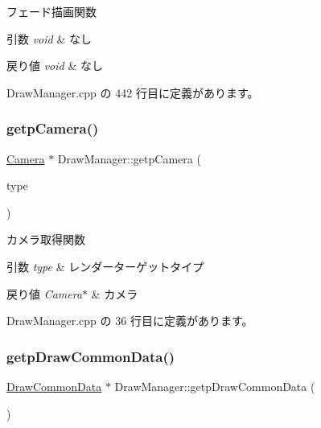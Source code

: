 フェード描画関数 


\begin{DoxyParams}{引数}
{\em void} & なし \\
\hline
\end{DoxyParams}

\begin{DoxyRetVals}{戻り値}
{\em void} & なし \\
\hline
\end{DoxyRetVals}


 Draw\+Manager.\+cpp の 442 行目に定義があります。

\mbox{\label{class_draw_manager_ac378ded8b0ef8c4fec3215b0a948680b}} 
\subsubsection{\texorpdfstring{getp\+Camera()}{getpCamera()}}
{\footnotesize\ttfamily \mbox{\hyperlink{class_camera}{Camera}} $\ast$ Draw\+Manager\+::getp\+Camera (\begin{DoxyParamCaption}\item[{\mbox{\hyperlink{class_draw_manager_a7ade407aee706c02454da2e53a559c9c}{Render\+Target\+Type}}}]{type }\end{DoxyParamCaption})}



カメラ取得関数 


\begin{DoxyParams}{引数}
{\em type} & レンダーターゲットタイプ \\
\hline
\end{DoxyParams}

\begin{DoxyRetVals}{戻り値}
{\em Camera$\ast$} & カメラ \\
\hline
\end{DoxyRetVals}


 Draw\+Manager.\+cpp の 36 行目に定義があります。

\mbox{\label{class_draw_manager_a92e7e6d7c9a8f55804ae375f79fb0107}} 
\subsubsection{\texorpdfstring{getp\+Draw\+Common\+Data()}{getpDrawCommonData()}}
{\footnotesize\ttfamily \mbox{\hyperlink{class_draw_common_data}{Draw\+Common\+Data}} $\ast$ Draw\+Manager\+::getp\+Draw\+Common\+Data (\begin{DoxyParamCaption}{ }\end{DoxyParamCaption})}



